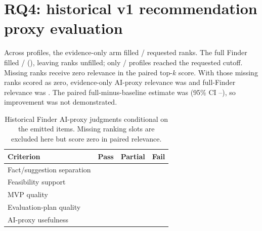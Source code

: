 \section{RQ4: historical v1 recommendation proxy evaluation}

Across \RecommendationProfileCount{} profiles, the evidence-only arm filled \RecommendationEvidenceReturnedCount{}/\RecommendationRequestedSlotCount{} requested ranks. The full Finder filled \RecommendationFullReturnedCount{}/\RecommendationRequestedSlotCount{} (\RecommendationFullReturnCoverage{}), leaving \RecommendationFullMissingCount{} ranks unfilled; only \RecommendationFullProfilesAtCutoff{}/\RecommendationProfileCount{} profiles reached the requested cutoff. Missing ranks receive zero relevance in the paired top-$k$ score. With those missing ranks scored as zero, evidence-only AI-proxy relevance was \RecommendationEvidenceRelevance{} and full-Finder relevance was \RecommendationFullRelevance{}. The paired full-minus-baseline estimate was \RecommendationRelevanceDifference{} (95\% CI \RecommendationDifferenceLow{}--\RecommendationDifferenceHigh{}), so improvement was not demonstrated.

\begin{table}[htbp]
\centering
\small
\caption{Historical Finder AI-proxy judgments conditional on the \RecommendationFullReturnedCount{} emitted items. Missing ranking slots are excluded here but score zero in paired relevance.}
\label{tab:recommendation-criteria}
\begin{tabularx}{\textwidth}{Yrrr}
\toprule
Criterion & Pass & Partial & Fail \\
\midrule
Fact/suggestion separation & \RecommendationSeparationPassCount{} & \RecommendationSeparationPartialCount{} & \RecommendationSeparationFailCount{} \\
Feasibility support & \RecommendationFeasibilityPassCount{} & \RecommendationFeasibilityPartialCount{} & \RecommendationFeasibilityFailCount{} \\
MVP quality & \RecommendationMvpPassCount{} & \RecommendationMvpPartialCount{} & \RecommendationMvpFailCount{} \\
Evaluation-plan quality & \RecommendationEvaluationPlanPassCount{} & \RecommendationEvaluationPlanPartialCount{} & \RecommendationEvaluationPlanFailCount{} \\
AI-proxy usefulness & \RecommendationUsefulnessPassCount{} & \RecommendationUsefulnessPartialCount{} & \RecommendationUsefulnessFailCount{} \\
\bottomrule
\end{tabularx}
\end{table}

